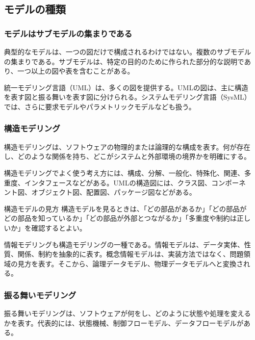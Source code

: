 \documentclass[a4paper,11pt]{ltjsarticle}
\numberwithin{figure}{section}
\numberwithin{table}{section}
\begin{document}
\subsection{モデルの種類}
\subsubsection{モデルはサブモデルの集まりである}
典型的なモデルは、一つの図だけで構成されるわけではない。複数のサブモデルの集まりである。サブモデルは、特定の目的のために作られた部分的な説明であり、一つ以上の図や表を含むことがある。

統一モデリング言語（UML）は、多くの図を提供する。UMLの図は、主に構造を表す図と振る舞いを表す図に分けられる。システムモデリング言語（SysML）では、さらに要求モデルやパラメトリックモデルなども扱う。

\subsubsection{構造モデリング}
構造モデリングは、ソフトウェアの物理的または論理的な構成を表す。何が存在し、どのような関係を持ち、どこがシステムと外部環境の境界かを明確にする。

構造モデリングでよく使う考え方には、構成、分解、一般化、特殊化、関連、多重度、インタフェースなどがある。UMLの構造図には、クラス図、コンポーネント図、オブジェクト図、配置図、パッケージ図などがある。

\begin{pointbox}{構造モデルの見方}
構造モデルを見るときは、「どの部品があるか」「どの部品がどの部品を知っているか」「どの部品が外部とつながるか」「多重度や制約は正しいか」を確認するとよい。
\end{pointbox}

情報モデリングも構造モデリングの一種である。情報モデルは、データ実体、性質、関係、制約を抽象的に表す。概念情報モデルは、実装方法ではなく、問題領域の見方を表す。そこから、論理データモデル、物理データモデルへと変換される。

\subsubsection{振る舞いモデリング}
振る舞いモデリングは、ソフトウェアが何をし、どのように状態や処理を変えるかを表す。代表的には、状態機械、制御フローモデル、データフローモデルがある。
\end{document}
